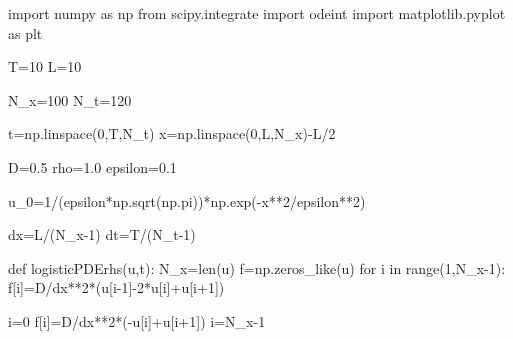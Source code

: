\documentclass[
  letterpaper,
  DIV=11,
  numbers=noendperiod]{scrreprt}
\newenvironment{Shaded}{\begin{snugshade}}{\end{snugshade}}
\newcommand{\BuiltInTok}[1]{\textcolor[rgb]{0.00,0.23,0.31}{#1}}
\newcommand{\ControlFlowTok}[1]{\textcolor[rgb]{0.00,0.23,0.31}{#1}}
\newcommand{\DecValTok}[1]{\textcolor[rgb]{0.68,0.00,0.00}{#1}}
\newcommand{\FloatTok}[1]{\textcolor[rgb]{0.68,0.00,0.00}{#1}}
\newcommand{\ImportTok}[1]{\textcolor[rgb]{0.00,0.46,0.62}{#1}}
\newcommand{\KeywordTok}[1]{\textcolor[rgb]{0.00,0.23,0.31}{#1}}
\newcommand{\NormalTok}[1]{\textcolor[rgb]{0.00,0.23,0.31}{#1}}
\newcommand{\OperatorTok}[1]{\textcolor[rgb]{0.37,0.37,0.37}{#1}}
\theoremstyle{plain}
\theoremstyle{definition}
\theoremstyle{plain}
\theoremstyle{remark}
\begin{document}
\begin{Shaded}
\begin{Highlighting}[]
\ImportTok{import}\NormalTok{ numpy }\ImportTok{as}\NormalTok{ np}
\ImportTok{from}\NormalTok{ scipy.integrate }\ImportTok{import}\NormalTok{ odeint}
\ImportTok{import}\NormalTok{ matplotlib.pyplot }\ImportTok{as}\NormalTok{ plt}

\NormalTok{T}\OperatorTok{=}\DecValTok{10}
\NormalTok{L}\OperatorTok{=}\DecValTok{10}

\NormalTok{N\_x}\OperatorTok{=}\DecValTok{100}
\NormalTok{N\_t}\OperatorTok{=}\DecValTok{120}

\NormalTok{t}\OperatorTok{=}\NormalTok{np.linspace(}\DecValTok{0}\NormalTok{,T,N\_t)}
\NormalTok{x}\OperatorTok{=}\NormalTok{np.linspace(}\DecValTok{0}\NormalTok{,L,N\_x)}\OperatorTok{{-}}\NormalTok{L}\OperatorTok{/}\DecValTok{2}

\NormalTok{D}\OperatorTok{=}\FloatTok{0.5}
\NormalTok{rho}\OperatorTok{=}\FloatTok{1.0}
\NormalTok{epsilon}\OperatorTok{=}\FloatTok{0.1}

\NormalTok{u\_0}\OperatorTok{=}\DecValTok{1}\OperatorTok{/}\NormalTok{(epsilon}\OperatorTok{*}\NormalTok{np.sqrt(np.pi))}\OperatorTok{*}\NormalTok{np.exp(}\OperatorTok{{-}}\NormalTok{x}\OperatorTok{**}\DecValTok{2}\OperatorTok{/}\NormalTok{epsilon}\OperatorTok{**}\DecValTok{2}\NormalTok{)}

\NormalTok{dx}\OperatorTok{=}\NormalTok{L}\OperatorTok{/}\NormalTok{(N\_x}\OperatorTok{{-}}\DecValTok{1}\NormalTok{)}
\NormalTok{dt}\OperatorTok{=}\NormalTok{T}\OperatorTok{/}\NormalTok{(N\_t}\OperatorTok{{-}}\DecValTok{1}\NormalTok{)}


\KeywordTok{def}\NormalTok{ logisticPDErhs(u,t):}
\NormalTok{    N\_x}\OperatorTok{=}\BuiltInTok{len}\NormalTok{(u)}
\NormalTok{    f}\OperatorTok{=}\NormalTok{np.zeros\_like(u)}
    \ControlFlowTok{for}\NormalTok{ i }\KeywordTok{in} \BuiltInTok{range}\NormalTok{(}\DecValTok{1}\NormalTok{,N\_x}\OperatorTok{{-}}\DecValTok{1}\NormalTok{):}
\NormalTok{      f[i]}\OperatorTok{=}\NormalTok{D}\OperatorTok{/}\NormalTok{dx}\OperatorTok{**}\DecValTok{2}\OperatorTok{*}\NormalTok{(u[i}\OperatorTok{{-}}\DecValTok{1}\NormalTok{]}\OperatorTok{{-}}\DecValTok{2}\OperatorTok{*}\NormalTok{u[i]}\OperatorTok{+}\NormalTok{u[i}\OperatorTok{+}\DecValTok{1}\NormalTok{])  }


\NormalTok{    i}\OperatorTok{=}\DecValTok{0}
\NormalTok{    f[i]}\OperatorTok{=}\NormalTok{D}\OperatorTok{/}\NormalTok{dx}\OperatorTok{**}\DecValTok{2}\OperatorTok{*}\NormalTok{(}\OperatorTok{{-}}\NormalTok{u[i]}\OperatorTok{+}\NormalTok{u[i}\OperatorTok{+}\DecValTok{1}\NormalTok{])}
\NormalTok{    i}\OperatorTok{=}\NormalTok{N\_x}\OperatorTok{{-}}\DecValTok{1}


\end{Highlighting}
\end{Shaded}
\end{document}
